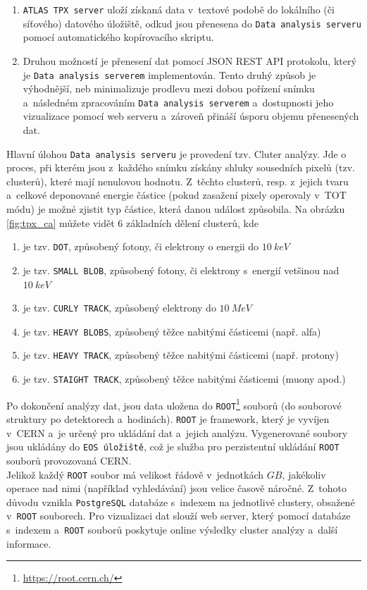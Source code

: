 \begin{description}
		\begin{enumerate}
			\item \texttt{ATLAS TPX server} uloží získaná data v~textové podobě do lokálního (či síťového) datového úložiště, odkud jsou přenesena do \texttt{Data analysis serveru} pomocí automatického kopírovacího skriptu.
			\item Druhou možností je přenesení dat pomocí JSON REST API protokolu, který je \texttt{Data analysis serverem} implementován. Tento druhý způsob je výhodnější, neb minimalizuje prodlevu mezi dobou pořízení snímku a~následném zpracováním \texttt{Data analysis serverem} a~dostupnosti jeho vizualizace pomocí web serveru a~zároveň přináší úsporu objemu přenesených dat.
		\end{enumerate}
		Hlavní úlohou \texttt{Data analysis serveru} je provedení tzv. Cluter analýzy. Jde o proces, při kterém jsou z~každého snímku získány shluky sousedních pixelů (tzv. clusterů), které mají nenulovou hodnotu. Z~těchto clusterů, resp. z~jejich tvaru a~celkové deponované energie částice (pokud zasažení pixely operovaly v~TOT módu) je možné zjistit typ částice, která danou událost způsobila. Na obrázku \ref{fig:tpx_ca} můžete vidět 6 základních dělení clusterů, kde
		 \begin{enumerate}[label=(\alph*)]
			\item je tzv. \texttt{DOT}, způsobený fotony, či elektrony o energii do $10~keV$
			\item je tzv. \texttt{SMALL BLOB}, způsobený fotony, či elektrony s~energií vetšinou nad $10~keV$
			\item je tzv. \texttt{CURLY TRACK}, způsobený elektrony do $10~MeV$
			\item je tzv. \texttt{HEAVY BLOBS}, způsobený těžce nabitými částicemi (např. alfa)
			\item je tzv. \texttt{HEAVY TRACK}, způsobený těžce nabitými částicemi (např. protony)
			\item je tzv. \texttt{STAIGHT TRACK}, způsobený těžce nabitými částicemi (muony apod.)
		\end{enumerate}
		Po dokončení analýzy dat, jsou data uložena do \texttt{ROOT}\footnote{\url{https://root.cern.ch/}} souborů (do souborové struktury po detektorech a~hodinách). \texttt{ROOT} je framework, který je vyvíjen v~CERN a~je určený pro ukládání dat a~jejich analýzu. Vygenerované soubory jsou ukládány do \texttt{EOS úložiště}, což je služba pro perzistentní ukládání \texttt{ROOT} souborů provozovaná CERN.\\
		Jelikož každý \texttt{ROOT} soubor má velikost řádově v~jednotkách $GB$, jakékoliv operace nad nimi (například vyhledávání) jsou velice časově náročné. Z~tohoto důvodu vznikla \texttt{PostgreSQL} databáze s~indexem na jednotlivé clustery, obsažené v~\texttt{ROOT} souborech. 
		Pro vizualizaci dat slouží web server, který pomocí databáze s~indexem a~\texttt{ROOT} souborů poskytuje online výsledky cluster analýzy a~další informace.
\end{description}


